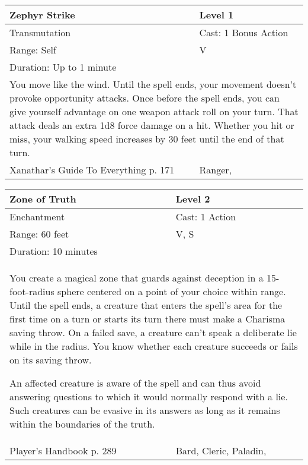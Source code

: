 \documentclass[11pt]{report}
\begin{document}
\begin{table}[H]
	\begin{tabular}{||p{6cm}|p{6cm}||}
		\hline\hline
		\bf{Zephyr Strike} & Level 1\\ \hline
		Transmutation & Cast: 1 Bonus Action\\ \hline
		Range: Self & V\\ \hline
		Duration: Up to 1 minute & \\ \hline
		\multicolumn{2}{||p{12cm}||}{You move like the wind. Until the spell ends, your movement doesn’t provoke opportunity attacks.
Once before the spell ends, you can give yourself advantage on one weapon attack roll on your turn. That attack deals an extra 1d8 force damage on a hit. Whether you hit or miss, your walking speed increases by 30 feet until the end of that turn.}\\ \hline
Xanathar's Guide To Everything p. 171 & Ranger, \\ \hline\hline
	\end{tabular}
\end{table}

\begin{table}[H]
	\begin{tabular}{||p{6cm}|p{6cm}||}
		\hline\hline
		\bf{Zone of Truth} & Level 2\\ \hline
		Enchantment & Cast: 1 Action\\ \hline
		Range: 60 feet & V, S\\ \hline
		Duration: 10 minutes & \\ \hline
		\multicolumn{2}{||p{12cm}||}{You create a magical zone that guards against deception in a 15-foot-radius sphere centered on a point of your choice within range.
Until the spell ends, a creature that enters the spell’s area for the first time on a turn or starts its turn there must make a Charisma saving throw. On a failed save, a creature can’t speak a deliberate lie while in the radius. You know whether each creature succeeds or fails on its saving throw.

An affected creature is aware of the spell and can thus avoid answering questions to which it would normally respond with a lie. Such creatures can be evasive in its answers as long as it remains within the boundaries of the truth.}\\ \hline
Player's Handbook p. 289 & Bard, Cleric, Paladin, \\ \hline\hline
	\end{tabular}
\end{table}
\end{document}
